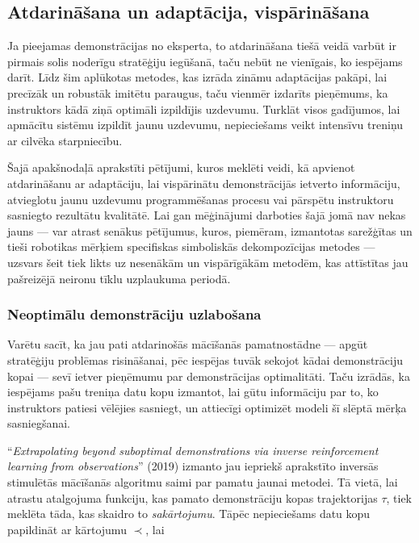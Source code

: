 \documentclass[12pt, a4paper]{article}
\numberwithin{equation}{section} %
\begin{document}
\subsection{Atdarināšana un adaptācija, vispārināšana}

Ja pieejamas demonstrācijas no eksperta, to atdarināšana tiešā veidā varbūt ir pirmais solis noderīgu stratēģiju iegūšanā, taču nebūt ne vienīgais, ko iespējams darīt. Līdz šim aplūkotas metodes, kas izrāda zināmu adaptācijas pakāpi, lai precīzāk un robustāk imitētu paraugus, taču vienmēr izdarīts pieņēmums, ka instruktors kādā ziņā optimāli izpildījis uzdevumu. Turklāt visos gadījumos, lai apmācītu sistēmu izpildīt jaunu uzdevumu, nepieciešams veikt intensīvu treniņu ar cilvēka starpniecību. 

Šajā apakšnodaļā aprakstīti pētījumi, kuros meklēti veidi, kā apvienot atdarināšanu ar adaptāciju, lai vispārinātu demonstrācijās ietverto informāciju, atvieglotu jaunu uzdevumu programmēšanas procesu vai pārspētu instruktoru sasniegto rezultātu kvalitātē. Lai gan mēģinājumi darboties šajā jomā nav nekas jauns --- var atrast senākus pētījumus, kuros, piemēram, izmantotas sarežģītas un tieši robotikas mērķiem specifiskas simboliskās dekompozīcijas metodes \cite{pastor2011skill} --- uzsvars šeit tiek likts uz nesenākām un vispārīgākām metodēm, kas attīstītas jau pašreizējā neironu tīklu uzplaukuma periodā.

\subsubsection{Neoptimālu demonstrāciju uzlabošana}

Varētu sacīt, ka jau pati atdarinošās mācīšanās pamatnostādne --- apgūt stratēģiju problēmas risināšanai, pēc iespējas tuvāk sekojot kādai demonstrāciju kopai --- sevī ietver pieņēmumu par demonstrācijas optimalitāti. Taču izrādās, ka iespējams pašu treniņa datu kopu izmantot, lai gūtu informāciju par to, ko instruktors patiesi vēlējies sasniegt, un attiecīgi optimizēt modeli šī slēptā mērķa sasniegšanai.

``\textit{Extrapolating beyond suboptimal demonstrations via inverse reinforcement learning from observations}'' \cite{brown2019extrapolating} (2019) izmanto jau iepriekš aprakstīto inversās stimulētās mācīšanās algoritmu saimi par pamatu jaunai metodei. Tā vietā, lai atrastu atalgojuma funkciju, kas pamato demonstrāciju kopas trajektorijas $\tau$, tiek meklēta tāda, kas skaidro to \textit{sakārtojumu}. Tāpēc nepieciešams datu kopu papildināt ar kārtojumu $\prec$, lai
\end{document}
